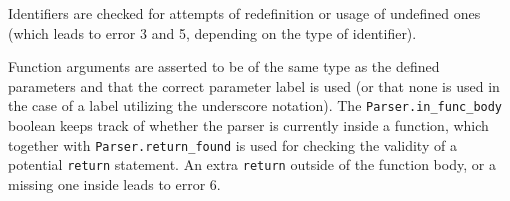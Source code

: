 Identifiers are checked for attempts of redefinition or usage of undefined ones (which leads to error 3 and 5, depending on the type of identifier). 

Function arguments are asserted to be of the same type as the defined parameters and that the correct parameter label is used (or that none is used in the case of a label utilizing the underscore notation). The \texttt{Parser.in\_func\_body} boolean keeps track of whether the parser is currently inside a function, which together with \texttt{Parser.return\_found} is used for checking the validity of a potential \texttt{return} statement. An extra \texttt{return} outside of the function body, or a missing one inside leads to error 6.